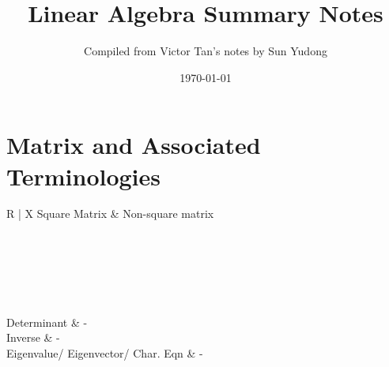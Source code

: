\documentclass[a5paper,titlepage]{article}
\title{Linear Algebra Summary Notes}
\author{Compiled from Victor Tan's notes by Sun Yudong}
\date{\today}
\begin{document}
	
	\maketitle
	
	\section{Matrix and Associated Terminologies}
	\begin{center}
		\renewcommand{\arraystretch}{1.2}
		\begin{tabularx}{\textwidth}{ R | X }
			Square Matrix	& Non-square matrix\\
			\hline
			 \\
			 \\
			 \\
			 \\
			 \\
			 \\
			Determinant	& - \\
			Inverse 	& - \\
			Eigenvalue/ Eigenvector/ Char. Eqn & -
		\end{tabularx}
	\end{center}
	
\end{document}
